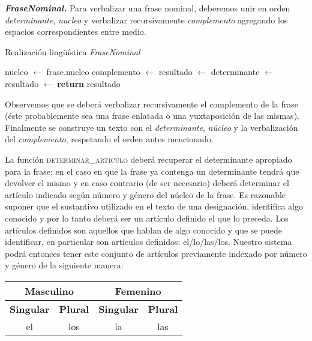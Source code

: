 \medskip
\noindent
\textbf{\emph{FraseNominal.}} Para verbalizar una frase nominal, deberemos unir en orden \textit{determinante}, \textit{nucleo} y verbalizar recursivamente \textit{complemento} agregando los espacios correspondientes entre medio.

\begin{algorithm}[H]
\caption{Realización lingüística \textit{FraseNominal}}
\begin{algorithmic}[1]
\State nucleo $\gets$ frase.nucleo
\State complemento $\gets$ 
\State resultado $\gets$ 
\Else
\State determinante $\gets$ 
\State resultado $\gets$ 
\EndIf
\State \textbf{return} resultado
\EndFunction
\end{algorithmic}
\end{algorithm}

\noindent
Observemos que se deberá verbalizar recursivamente el complemento de la frase (éste probablemente sea una frase enlatada o una yuxtaposición de las mismas). Finalmente se construye un texto con el \emph{determinante}, \emph{núcleo} y la verbalización del \emph{complemento}, respetando el orden antes mencionado.

La función \textsc{determinar\_articulo} deberá recuperar el determinante apropiado para la frase; en el caso en que la frase ya contenga un determinante tendrá que devolver el mismo y en caso contrario (de ser necesario) deberá determinar el artículo indicado según número y género del núcleo de la frase. Es razonable suponer que el sustantivo utilizado en el texto de una designación, identifica algo conocido y por lo tanto deberá ser un artículo definido el que lo preceda. Los artículos definidos son aquellos que hablan de algo conocido y que se puede identificar, en particular son artículos definidos: el/lo/las/los. Nuestro sistema podrá entonces tener este conjunto de artículos previamente indexado por número y género de la siguiente manera:

\begin{table}[H]
\centering
\begin{tabular}{|c|c|c|c|}
\hline
\multicolumn{2}{|c|}{\textbf{Masculino}} & \multicolumn{2}{c|}{\textbf{Femenino}} \\ \hline
\textbf{Singular}    & \textbf{Plural}   & \textbf{Singular}   & \textbf{Plural}  \\ \hline
el                   & los               & la                  & las              \\ \hline
\end{tabular}
\end{table}

